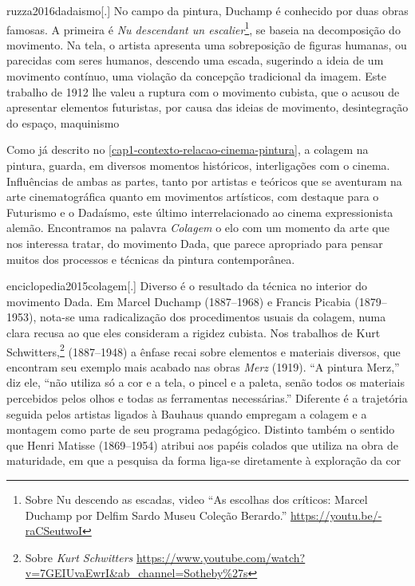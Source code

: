 \begin{displaycquote}[108]{ruzza2016dadaismo}[.]
	No campo da pintura, Duchamp é conhecido por duas obras famosas. A
	primeira é \emph{Nu descendant un escalier}\footnote{%
		Sobre Nu descendo as escadas, video \enquote{As escolhas dos críticos:
			Marcel Duchamp por Delfim Sardo \textbar{} Museu Coleção Berardo.}
		\url{https://youtu.be/-raCSeutwoI}}, se baseia na decomposição do
	movimento. Na tela, o artista apresenta uma sobreposição de figuras
	humanas, ou parecidas com seres humanos, descendo uma escada, sugerindo
	a ideia de um movimento contínuo, uma violação da concepção tradicional
	da imagem. Este trabalho de 1912 lhe valeu a ruptura com o movimento
	cubista, que o acusou de apresentar elementos futuristas, por causa das
	ideias de movimento, desintegração do espaço, maquinismo
\end{displaycquote}

Como já descrito no \cref{cap1-contexto-relacao-cinema-pintura}, a colagem
na pintura, guarda, em
diversos momentos históricos, interligações com o cinema. Influências
de ambas as partes, tanto por artistas e teóricos que se aventuram na
arte cinematográfica quanto em movimentos artísticos, com destaque para
o Futurismo e o Dadaísmo, este último interrelacionado ao cinema
expressionista alemão. Encontramos na palavra \emph{Colagem} o elo com
um momento da arte que nos interessa tratar, do movimento Dada, que
parece apropriado para pensar muitos dos processos e técnicas da
pintura contemporânea.

\begin{displaycquote}{enciclopedia2015colagem}[.]
	Diverso é o resultado da técnica no interior do movimento Dada. Em
	Marcel Duchamp (1887--1968) e Francis Picabia (1879--1953), nota-se uma
	radicalização dos procedimentos usuais da colagem, numa clara recusa ao
	que eles consideram a rigidez cubista. Nos trabalhos de Kurt
	Schwitters,\footnote{Sobre \emph{Kurt Schwitters}
		\url{https://www.youtube.com/watch?v=7GEIUvaEwrI\&ab\_channel=Sotheby\%27s}}
	(1887--1948) a ênfase recai sobre elementos e materiais diversos, que
	encontram seu exemplo mais acabado nas obras \emph{Merz} (1919). \enquote{A
		pintura Merz,} diz ele, \enquote{não utiliza só a cor e a tela, o pincel e a
		paleta, senão todos os materiais percebidos pelos olhos e todas as
		ferramentas necessárias.} \textelp{} Diferente é a trajetória seguida
	pelos artistas ligados à Bauhaus quando empregam a colagem e a montagem
	como parte de seu programa pedagógico. Distinto também o sentido que
	Henri Matisse (1869--1954) atribui aos papéis colados que utiliza na obra
	de maturidade, em que a pesquisa da forma liga-se diretamente à
	exploração da cor
\end{displaycquote}

